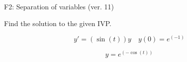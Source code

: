 \begin{exercise}
  \begin{exerciseTitle}F2: Separation of variables (ver. 11)\end{exerciseTitle}
  \begin{exerciseStatement}
    
Find the solution to the given IVP.

    
\[y'=( \sin\left(t\right) )y\hspace{1em} y(0)= e^{\left(-1\right)}\]

  \end{exerciseStatement}
  \begin{exerciseAnswer}
    
\[y= e^{\left(-\cos\left(t\right)\right)}\]

  \end{exerciseAnswer}
\end{exercise}